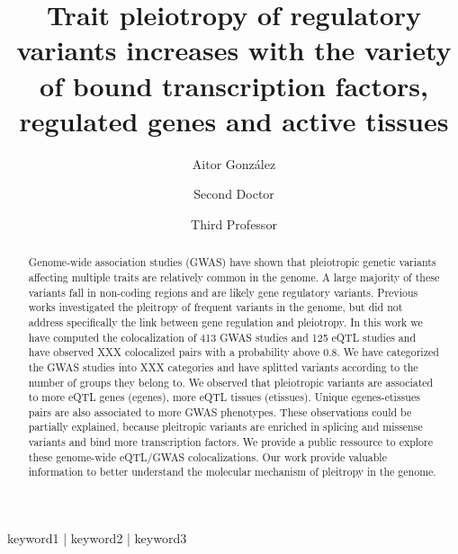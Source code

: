 
\title{Trait pleiotropy of regulatory variants increases with the variety of bound transcription factors, regulated genes and active tissues}

\author[1,\Letter]{Aitor González }
\author[2]{Second Doctor }
\author[1]{Third Professor }
\date{}

\maketitle

\begin{abstract}

Genome-wide association studies (GWAS) have shown that pleiotropic genetic variants affecting multiple traits are relatively common in the genome.
A large majority of these variants fall in non-coding regions and are likely gene regulatory variants.
Previous works investigated the pleitropy of frequent variants in the genome, but did not address specifically the link between gene regulation and pleiotropy.
%
In this work we have computed the colocalization of 413 GWAS studies and 125 eQTL studies and have observed XXX colocalized pairs with a probability above 0.8.
We have categorized the GWAS studies into XXX categories and have splitted variants according to the number of groups they belong to.
We observed that pleiotropic variants are associated to more eQTL genes (egenes), more eQTL tissues (etissues).
Unique egenes-etissues pairs are also associated to more GWAS phenotypes.
These observations could be partially explained, because pleitropic variants are enriched in splicing and missense variants and bind more transcription factors.
We provide a public ressource to explore these genome-wide eQTL/GWAS colocalizations.
%
Our work provide valuable information to better understand the molecular mechanism of pleitropy in the genome.


\lipsum[1][1]
\end{abstract}

\begin{keywords}
keyword1 | keyword2 | keyword3
\end{keywords}

\begin{corrauthor}
\end{corrauthor}

